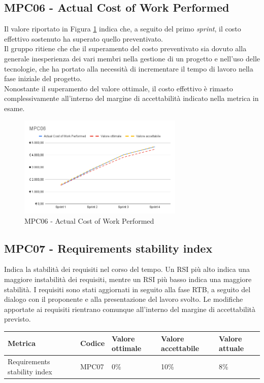\subsection{MPC06 - Actual Cost of Work Performed}
\label{s:mpc06}
Il valore riportato in Figura \ref{fig:mpc06} indica che, a seguito del primo \textit{sprint}, il costo effettivo sostenuto ha superato quello preventivato.\\
Il gruppo ritiene che che il superamento del costo preventivato sia dovuto alla generale inesperienza dei vari membri nella gestione di un progetto e nell'uso delle tecnologie, che ha portato alla necessità di incrementare il tempo di lavoro nella fase iniziale del progetto.\\
Nonostante il superamento del valore ottimale, il costo effettivo è rimasto complessivamente all'interno del margine di accettabilità indicato nella metrica in esame.

\begin{figure}[htbp]
    \centering
    \includegraphics[width=0.7\textwidth]{img/MPC06.png}
    \caption{MPC06 - Actual Cost of Work Performed}
    \label{fig:mpc06}
\end{figure}


\subsection{MPC07 - Requirements stability index}
\label{s:mpc07}
Indica la stabilità dei requisiti nel corso del tempo.
Un RSI più alto indica una maggiore instabilità dei requisiti, mentre un RSI più basso indica una maggiore stabilità.
I requisiti sono stati aggiornati in seguito alla fase RTB, a seguito del dialogo con il proponente e alla presentazione del lavoro svolto.
Le modifiche apportate ai requisiti rientrano comunque all'interno del margine di accettabilità previsto.
\begin{table}[H]
    \centering
    \begin{tabularx}{\textwidth}{X|l|l|l|l}
        \hline
        \textbf{Metrica}             & \textbf{Codice} & \textbf{Valore ottimale} & \textbf{Valore accettabile} & \textbf{Valore attuale} \\
        \hline
        Requirements stability index & MPC07           & 0\%                      & 10\%                        & 8\%                     \\
        \hline
    \end{tabularx}
\end{table}



